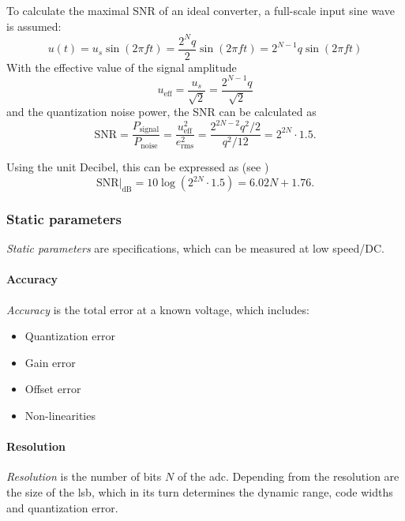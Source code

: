 To calculate the maximal SNR of an ideal converter, a full-scale input sine wave is assumed:
\begin{equation}
u(t) = u_s \sin(2\pi f t) = \frac{2^{N}q}{2}\sin(2\pi f t)  = 2^{N-1}q \sin(2\pi f t)
\end{equation}
With the effective value of the signal amplitude
\begin{equation}
u_{\text{eff}} = \frac{u_s}{\sqrt{2}} = \frac{2^{N-1}q}{\sqrt{2}}
\end{equation}
and the quantization noise power, the SNR can be calculated as
\begin{equation}
\text{SNR} = \frac{P_{\text{signal}}}{P_{\text{noise}}} = \frac{u_{\text{eff}}^{2}}{e_{\text{rms}}^{2}} = \frac{2^{2N-2}q^2/2}{q^2/12} = 2^{2N} \cdot 1.5.
\end{equation}

Using the unit Decibel, this can be expressed as (see \cite{puente2015,walt})
\begin{equation}
\text{SNR}|_{\text{dB}} = 10\log\left(2^{2N}\cdot 1.5\right) = 6.02 N + 1.76.
\end{equation}



\subsubsection{Static parameters}
\textit{Static parameters} are specifications, which can be measured at low speed/DC. 
\paragraph{Accuracy}
\textit{Accuracy} is the total error at a known voltage, which includes:
\begin{itemize}[noitemsep]
	\item Quantization error
	\item Gain error
	\item Offset error
	\item Non-linearities
\end{itemize}

\paragraph{Resolution}
\textit{Resolution} is the number of bits $N$ of the \gls{adc}. Depending from the resolution are the size of the \gls{lsb}, which in its turn determines the dynamic range, code widths and quantization error.

